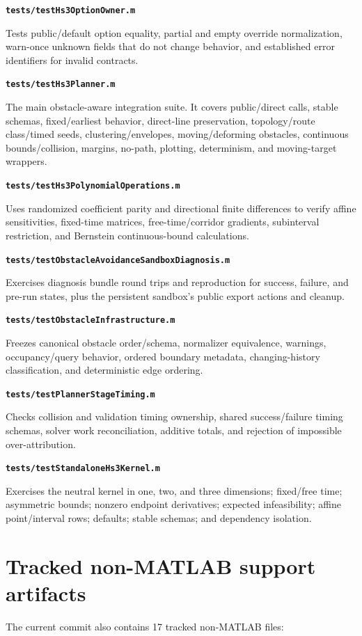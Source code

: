 \documentclass[10pt,letterpaper]{article}
\newcommand{\file}[1]{\nolinkurl{#1}}
\newcommand{\scriptentry}[2]{%
  \par\medskip\noindent\textbf{\file{#1}}\par
  \begingroup\raggedright #2\par\endgroup
}
\begin{document}
\scriptentry{tests/testHs3OptionOwner.m}{Tests public/default option equality,
partial and empty override normalization, warn-once unknown fields that do not
change behavior, and established error identifiers for invalid contracts.}

\scriptentry{tests/testHs3Planner.m}{The main obstacle-aware integration suite.
It covers public/direct calls, stable schemas, fixed/earliest behavior,
direct-line preservation, topology/route class/timed seeds, clustering/envelopes,
moving/deforming obstacles, continuous bounds/collision, margins, no-path,
plotting, determinism, and moving-target wrappers.}

\scriptentry{tests/testHs3PolynomialOperations.m}{Uses randomized coefficient
parity and directional finite differences to verify affine sensitivities,
fixed-time matrices, free-time/corridor gradients, subinterval restriction, and
Bernstein continuous-bound calculations.}

\scriptentry{tests/testObstacleAvoidanceSandboxDiagnosis.m}{Exercises diagnosis
bundle round trips and reproduction for success, failure, and pre-run states,
plus the persistent sandbox's public export actions and cleanup.}

\scriptentry{tests/testObstacleInfrastructure.m}{Freezes canonical obstacle
order/schema, normalizer equivalence, warnings, occupancy/query behavior,
ordered boundary metadata, changing-history classification, and deterministic
edge ordering.}

\scriptentry{tests/testPlannerStageTiming.m}{Checks collision and validation
timing ownership, shared success/failure timing schemas, solver work
reconciliation, additive totals, and rejection of impossible over-attribution.}

\scriptentry{tests/testStandaloneHs3Kernel.m}{Exercises the neutral kernel in
one, two, and three dimensions; fixed/free time; asymmetric bounds; nonzero
endpoint derivatives; expected infeasibility; affine point/interval rows;
defaults; stable schemas; and dependency isolation.}

\section{Tracked non-MATLAB support artifacts}

The current commit also contains 17 tracked non-MATLAB files:
\end{document}
